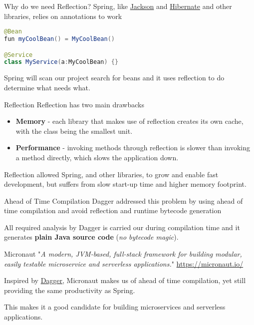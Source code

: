 \documentclass{beamer}
\begin{document}
  \begin{frame}[t,fragile]{Why do we need Reflection?}
    Spring, like \href{https://github.com/FasterXML/jackson-module-kotlin}{Jackson} and \href{https://hibernate.org/orm/}{Hibernate} and other libraries, relies on annotations to work

    \vspace{16pt}
    \begin{lstlisting}[language=Java, backgroundcolor = \color{green!5}]
@Bean
fun myCoolBean() = MyCoolBean()

@Service
class MyService(a:MyCoolBean) {}
    \end{lstlisting}

    \vspace{16pt}
    Spring will scan our project search for beans and it uses reflection to do determine what needs what.
  \end{frame}


  \begin{frame}[t]{Reflection}
    Reflection has two main drawbacks
    \begin{itemize}
      \item \textbf{Memory} - each library that makes use of reflection creates its own cache, with the class being the smallest unit.
      \item \textbf{Performance} - invoking methods through reflection is slower than invoking a method directly, which slows the application down.
    \end{itemize}

    \vspace{16pt}
    Reflection allowed Spring, and other libraries, to grow and enable fast development, but suffers from slow start-up time and higher memory footprint.
  \end{frame}


  \begin{frame}[t]{Ahead of Time Compilation}
    Dagger addressed this problem by using ahead of time compilation and avoid reflection and runtime bytecode generation

    All required analysis by Dagger is carried our during compilation time and it generates \textbf{plain Java source code} (\textit{no bytecode magic}).
  \end{frame}


  \begin{frame}[t]{Micronaut}
    "\textit{A modern, JVM-based, full-stack framework for building modular, easily testable microservice and serverless applications.}"
    \newline
    {\footnotesize \href{https://micronaut.io/}{https://micronaut.io/}}

    \vspace{16pt}
    Inspired by \href{https://github.com/google/dagger}{Dagger}, Micronaut makes us of ahead of time compilation, yet still providing the same productivity as Spring.

    This makes it a good candidate for building microservices and serverless applications.
  \end{frame}
\end{document}
